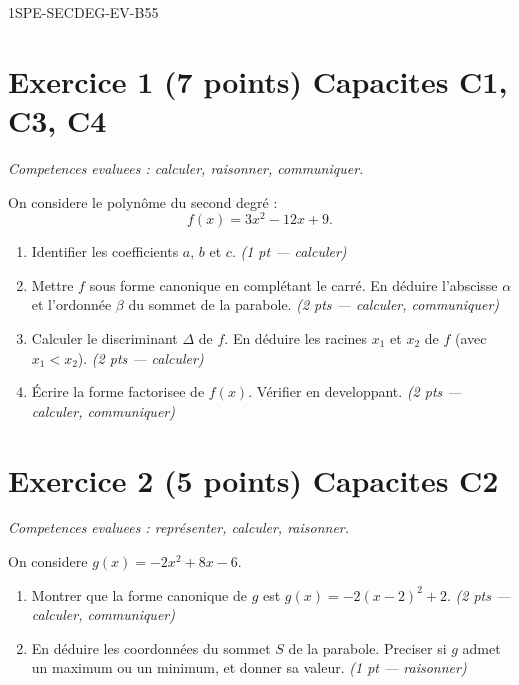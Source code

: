 \begin{evaluation}{1SPE-SECDEG-EV-B}{55}

\section*{Exercice 1 \hfill (7 points) \hfill Capacites C1, C3, C4}

\textit{Competences evaluees : calculer, raisonner, communiquer.}

\medskip
On considere le polynôme du second degré :
\[
  f(x) = 3x^2 - 12x + 9.
\]

\begin{enumerate}
  \item Identifier les coefficients $a$, $b$ et $c$.
  \hfill\textit{(1 pt — calculer)}

  \item Mettre $f$ sous forme canonique en complétant le carré.
  En déduire l'abscisse $\alpha$ et l'ordonnée $\beta$ du sommet de la parabole.
  \hfill\textit{(2 pts — calculer, communiquer)}

  \item Calculer le discriminant $\Delta$ de $f$. En déduire les racines $x_1$ et $x_2$ de $f$ (avec $x_1 < x_2$).
  \hfill\textit{(2 pts — calculer)}

  \item Écrire la forme factorisee de $f(x)$.
  Vérifier en developpant.
  \hfill\textit{(2 pts — calculer, communiquer)}
\end{enumerate}

\section*{Exercice 2 \hfill (5 points) \hfill Capacites C2}

\textit{Competences evaluees : représenter, calculer, raisonner.}

\medskip
On considere $g(x) = -2x^2 + 8x - 6$.

\begin{enumerate}
  \item Montrer que la forme canonique de $g$ est $g(x) = -2(x-2)^2 + 2$.
  \hfill\textit{(2 pts — calculer, communiquer)}

  \item En déduire les coordonnées du sommet $S$ de la parabole.
  Preciser si $g$ admet un maximum ou un minimum, et donner sa valeur.
  \hfill\textit{(1 pt — raisonner)}


\end{enumerate}
\end{evaluation}
